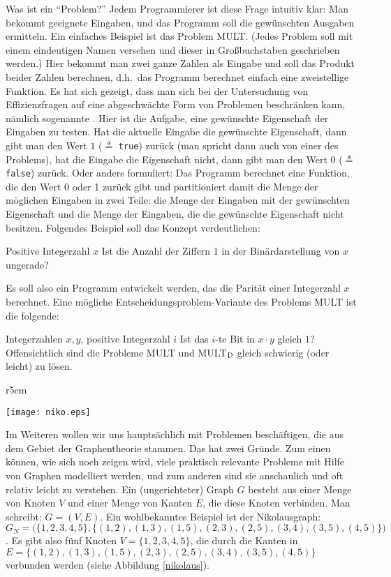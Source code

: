 Was ist ein "`Problem?"' Jedem Programmierer ist diese Frage intuitiv
klar: Man bekommt geeignete Eingaben, und das Programm soll die
gewünschten Ausgaben ermitteln. Ein einfaches Beispiel ist das Problem
MULT. (Jedes Problem soll mit einem eindeutigen Namen versehen und
dieser in Großbuchstaben geschrieben werden.) Hier bekommt man zwei
ganze Zahlen als Eingabe und soll das Produkt beider Zahlen berechnen,
d.h.~das Programm berechnet einfach eine zweistellige Funktion. Es hat
sich gezeigt, dass man sich bei der Untersuchung von Effizienzfragen
auf eine abgeschwächte Form von Problemen beschränken kann, nämlich
sogenannte . Hier ist die Aufgabe, eine
gewünschte Eigenschaft der Eingaben zu testen. Hat die aktuelle
Eingabe die gewünschte Eigenschaft, dann gibt man den Wert $1$
($\triangleq$ \texttt{true}) zurück
(man spricht dann auch von einer 
 des Problems), hat 
die Eingabe die Eigenschaft nicht, dann gibt man den Wert $0$
($\triangleq$ \texttt{false}) zurück. Oder anders formuliert: Das
Programm berechnet eine Funktion, die den Wert 0 oder 1 zurück gibt
und partitioniert damit die Menge der möglichen Eingaben in zwei
Teile: die Menge der Eingaben mit der gewünschten Eigenschaft und die
Menge der Eingaben, die die gewünschte Eigenschaft nicht
besitzen. Folgendes Beispiel soll das Konzept verdeutlichen:

{Positive Integerzahl $x$}
{Ist die Anzahl der Ziffern 1 in der Binärdarstellung von $x$ ungerade?}

Es soll also ein Programm entwickelt werden, das die Parität einer
Integerzahl $x$ berechnet. Eine mögliche Entscheidungsproblem-Variante
des Problems MULT ist die folgende:

\goodbreak
{}
{Integerzahlen $x,y$, positive Integerzahl $i$}
{Ist das $i$-te Bit in $x\cdot y$ gleich $1$?}
Offensichtlich sind die Probleme MULT und MULT$\rm_D$ gleich schwierig (oder
leicht) zu lösen.

\begin{wrapfigure}[14]{r}{5cm}
\centerline{\texttt{[image: niko.eps]}}
\caption{Der Graph $G_N$}
\label{nikolaus} 
\end{wrapfigure}
Im Weiteren wollen wir uns hauptsächlich mit Problemen beschäftigen,
die aus dem Gebiet der Graphentheorie stammen.  Das hat zwei
Gründe. Zum einen können, wie sich noch zeigen wird, viele praktisch
relevante Probleme mit Hilfe von Graphen modelliert werden, und zum
anderen sind sie anschaulich und oft relativ leicht zu verstehen.  Ein
(ungerichteter) Graph $G$ besteht aus einer Menge von Knoten $V$ und
einer Menge von Kanten $E$, die diese Knoten verbinden. Man schreibt:
$G=(V,E)$. Ein wohlbekanntes Beispiel ist der Nikolausgraph:
$G_N=\bigl(\{1,2,3,4,5\},\allowbreak\{(1,2),\allowbreak(1,3),\allowbreak
(1,5),\allowbreak(2,3),\allowbreak(2,5),\allowbreak(3,4),\allowbreak
(3,5),\allowbreak(4,5)\}\bigr)$.  Es gibt also fünf Knoten
$V=\{1,2,3,4,5\}$, die durch die Kanten in
$E=\{(1,2),\allowbreak(1,3),\allowbreak(1,5),\allowbreak(2,3),\allowbreak
(2,5),\allowbreak(3,4),\allowbreak(3,5),\allowbreak(4,5)\}$ verbunden
werden (siehe Abbildung \ref{nikolaus}).


